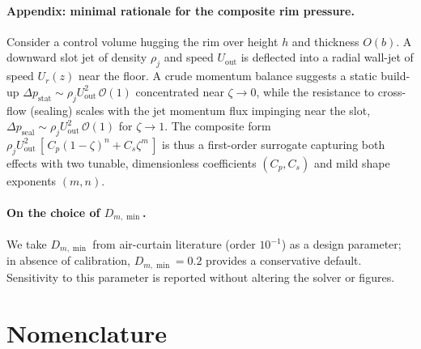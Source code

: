 \documentclass[11pt,a4paper]{article}
\begin{document}
\paragraph{Appendix: minimal rationale for the composite rim pressure.}
Consider a control volume hugging the rim over height $h$ and thickness $O(b)$.
A downward slot jet of density $\rho_j$ and speed $U_{\mathrm{out}}$ is deflected
into a radial wall-jet of speed $U_r(z)$ near the floor. A crude momentum balance
suggests a static build-up $\Delta p_{\mathrm{stat}}\sim \rho_j U_{\mathrm{out}}^2
\,\mathcal{O}(1)$ concentrated near $\zeta\!\to\!0$, while the resistance to
cross-flow (sealing) scales with the jet momentum flux impinging near the slot,
$\Delta p_{\mathrm{seal}}\sim \rho_j U_{\mathrm{out}}^2\,\mathcal{O}(1)$ for
$\zeta\!\to\!1$. The composite form
$\rho_j U_{\mathrm{out}}^2\,[\,C_p(1-\zeta)^n + C_s \zeta^m\,]$ is thus a
first-order surrogate capturing both effects with two tunable, dimensionless
coefficients $(C_p,C_s)$ and mild shape exponents $(m,n)$.

\paragraph{On the choice of $D_{m,\min}$.}
We take $D_{m,\min}$ from air-curtain literature (order $10^{-1}$) as a design parameter; in absence of calibration, $D_{m,\min}=0.2$ provides a conservative default.
Sensitivity to this parameter is reported without altering the solver or figures.

\section{Nomenclature}
\label{sec:nomenclature}
\end{document}
